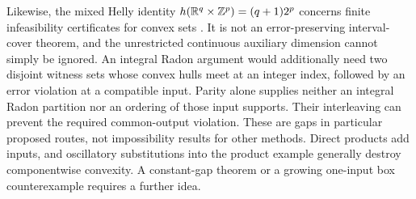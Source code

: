 Likewise, the mixed Helly identity
$h(\mathbb R^q\times\mathbb Z^p)=(q+1)2^p$ concerns finite infeasibility certificates
for convex sets \citep[Theorem 1.1]{averkov2012}. It is not an
error-preserving interval-cover theorem, and the unrestricted continuous
auxiliary dimension cannot simply be ignored. An integral Radon argument
would additionally need two disjoint witness sets whose convex hulls
meet at an integer index, followed by an error violation at a compatible
input. Parity alone supplies neither an integral Radon partition nor
an ordering of those input supports. Their interleaving can prevent the
required common-output violation. These are gaps in particular proposed
routes, not impossibility results for other methods. Direct products add
inputs, and oscillatory substitutions into the product example generally
destroy componentwise convexity. A constant-gap theorem or a growing
one-input box counterexample requires a further idea.
